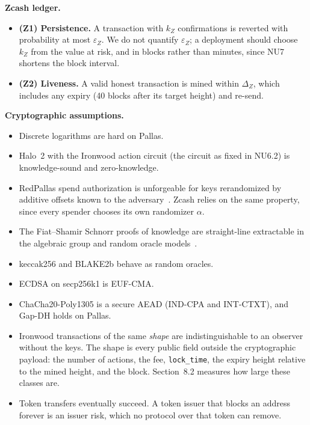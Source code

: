 \documentclass[10pt,letterpaper]{article}
\theoremstyle{plain}
\theoremstyle{definition}
\begin{document}
\textbf{Zcash ledger.}
\begin{itemize}\setlength\itemsep{0.05em}
\item \textbf{(Z1) Persistence.} A transaction with $k_Z$ confirmations is reverted with
probability at most $\varepsilon_Z$. We do not quantify $\varepsilon_Z$; a deployment should
choose $k_Z$ from the value at risk, and in blocks rather than minutes, since NU7 shortens the
block interval.
\item \textbf{(Z2) Liveness.} A valid honest transaction is mined within $\Delta_Z$, which
includes any expiry (40 blocks after its target height) and re-send.
\end{itemize}

\textbf{Cryptographic assumptions.}
\begin{itemize}\setlength\itemsep{0.05em}
\item Discrete logarithms are hard on Pallas.
\item Halo~2 with the Ironwood action circuit (the circuit as fixed in NU6.2) is knowledge-sound
and zero-knowledge.
\item RedPallas spend authorization is unforgeable for keys rerandomized by additive offsets known
to the adversary~\cite{spec,rerandfrost}. Zcash relies on the same property, since every spender
chooses its own randomizer $\alpha$.
\item The Fiat--Shamir Schnorr proofs of knowledge are straight-line extractable in the
algebraic group and random oracle models~\cite{agm}.
\item keccak256 and BLAKE2b behave as random oracles.
\item ECDSA on secp256k1 is EUF-CMA.
\item ChaCha20-Poly1305 is a secure AEAD (IND-CPA and INT-CTXT), and Gap-DH holds on Pallas.
\item Ironwood transactions of the same \emph{shape} are indistinguishable to an observer without
the keys. The shape is every public field outside the cryptographic payload: the number of
actions, the fee, \texttt{lock\_time}, the expiry height relative to the mined height, and the
block. Section~8.2 measures how large these classes are.
\item Token transfers eventually succeed. A token issuer that blocks an address forever is an
issuer risk, which no protocol over that token can remove.
\end{itemize}
\end{document}
